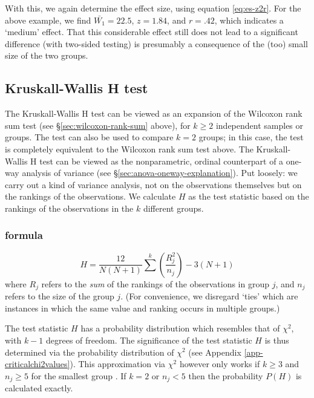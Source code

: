 \documentclass[
]{book}
\begin{document}
With this, we again determine the effect size, using equation \eqref{eq:es-z2r}.
For the above example, we find
\(\bar{W_1}=22.5\), \(z=1.84\), and \(r=.42\), which indicates a
`medium' effect. That this considerable effect still does
not lead to a significant difference (with two-sided testing) is presumably
a consequence of the (too) small size of the two groups.

\hypertarget{kruskall-wallis-h-test}{%
\subsection{Kruskall-Wallis H test}\label{kruskall-wallis-h-test}}

The Kruskall-Wallis H test can be viewed as an expansion of the
Wilcoxon rank sum test (see
§\ref{sec:wilcoxon-rank-sum} above), for \(k \ge 2\) independent samples
or groups. The test can also be used to compare \(k=2\) groups;
in this case, the test is completely equivalent to the Wilcoxon rank sum
test above. The Kruskall-Wallis H test can be viewed as the
nonparametric, ordinal counterpart of a one-way analysis of variance
(see §\ref{sec:anova-oneway-explanation}). Put loosely: we carry out a kind of
variance analysis, not on the observations themselves but on the rankings of the
observations. We calculate \(H\) as the test statistic based on the rankings
of the observations in the \(k\) different
groups.

\hypertarget{formula}{%
\subsubsection{formula}\label{formula}}

\begin{equation}
  \label{eq:kruskall-wallis-H}
    H = \frac{12}{N(N+1)} \sum^{k} (\frac{R^2_j}{n_j}) - 3(N+1)
\end{equation}
where \(R_j\) refers to the \emph{sum} of the rankings of the observations
in group \(j\), and \(n_j\) refers to the size of the group \(j\).
(For convenience, we disregard `ties'
which are instances in which the same value and ranking occurs in
multiple groups.)

The test statistic \(H\) has a probability distribution which resembles that of
\(\chi^2\), with \(k-1\) degrees of freedom. The significance of the
test statistic \(H\) is thus determined via the probability distribution of
\(\chi^2\) (see Appendix \ref{app-criticalchi2values}).
This approximation via \(\chi^2\) however only works if \(k\ge3\)
and \(n_j\ge5\) for the smallest group \citep{Ferg89}.
If \(k=2\) or \(n_j<5\) then the probability \(P(H)\) is calculated exactly.
\end{document}
